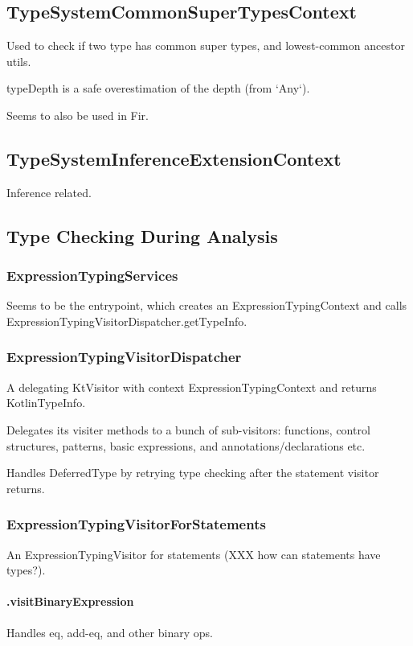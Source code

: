 \documentclass{article}
\begin{document}
\subsection{TypeSystemCommonSuperTypesContext}

Used to check if two type has common super types, and lowest-common ancestor utils.

typeDepth is a safe overestimation of the depth (from `Any`).

Seems to also be used in Fir.

\subsection{TypeSystemInferenceExtensionContext}

Inference related.

\subsection{Type Checking During Analysis}

\subsubsection{ExpressionTypingServices} Seems to be the entrypoint, which creates an ExpressionTypingContext and calls ExpressionTypingVisitorDispatcher.getTypeInfo.

\subsubsection{ExpressionTypingVisitorDispatcher} A delegating KtVisitor with context ExpressionTypingContext and returns KotlinTypeInfo.

Delegates its visiter methods to a bunch of sub-visitors: functions, control structures, patterns, basic expressions, and annotations/declarations etc.

Handles DeferredType by retrying type checking after the statement visitor returns.

\subsubsection{ExpressionTypingVisitorForStatements} An ExpressionTypingVisitor for statements (XXX how can statements have types?).

\paragraph{.visitBinaryExpression}
Handles eq, add-eq, and other binary ops.
\end{document}
